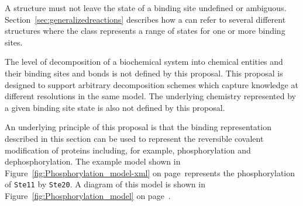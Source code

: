 \documentclass{cekarticle}
\begin{document}
A  structure must not leave the state of a binding site undefined or ambiguous.
Section~\ref{sec:generalizedreactions} describes how a  can refer to 
several different  structures where the class represents a range of states for one
or more binding sites.

The level of decomposition of a biochemical system into chemical entities and their binding sites and
bonds is not defined by this proposal.  This proposal is designed to support arbitrary decomposition
schemes which capture knowledge at different resolutions in the same model. The
underlying chemistry represented by a given binding site state is also not defined by this proposal.

An underlying principle of this proposal is that the binding representation described in this section
can be used to represent the reversible covalent modification of proteins including, for example,
phosphorylation and dephosphorylation.  The example model shown in
Figure~\ref{fig:Phosphorylation_model-xml} on page~\pageref{fig:Phosphorylation_model-xml}represents
the phosphorylation of \texttt{Ste11} by \texttt{Ste20}.  A diagram of this model is shown in
Figure~\ref{fig:Phosphorylation_model} on page~\pageref{fig:Phosphorylation_model}.
\end{document}
